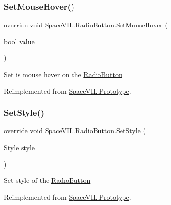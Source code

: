 \subsubsection{\texorpdfstring{Set\+Mouse\+Hover()}{SetMouseHover()}}
{\footnotesize\ttfamily override void Space\+V\+I\+L.\+Radio\+Button.\+Set\+Mouse\+Hover (\begin{DoxyParamCaption}\item[{bool}]{value }\end{DoxyParamCaption})\hspace{0.3cm}{\ttfamily [virtual]}}



Set is mouse hover on the \mbox{\hyperlink{class_space_v_i_l_1_1_radio_button}{Radio\+Button}} 



Reimplemented from \mbox{\hyperlink{class_space_v_i_l_1_1_prototype}{Space\+V\+I\+L.\+Prototype}}.

\mbox{\label{class_space_v_i_l_1_1_radio_button_a35b4ba018fc4af405f853e6628fb5271}} 
\subsubsection{\texorpdfstring{Set\+Style()}{SetStyle()}}
{\footnotesize\ttfamily override void Space\+V\+I\+L.\+Radio\+Button.\+Set\+Style (\begin{DoxyParamCaption}\item[{\mbox{\hyperlink{class_space_v_i_l_1_1_decorations_1_1_style}{Style}}}]{style }\end{DoxyParamCaption})\hspace{0.3cm}{\ttfamily [virtual]}}



Set style of the \mbox{\hyperlink{class_space_v_i_l_1_1_radio_button}{Radio\+Button}} 



Reimplemented from \mbox{\hyperlink{class_space_v_i_l_1_1_prototype_ae96644a6ace490afb376fb542161e541}{Space\+V\+I\+L.\+Prototype}}.

\mbox{\label{class_space_v_i_l_1_1_radio_button_a2759a336ec7d6f94e15163498eb5f5f8}} 
